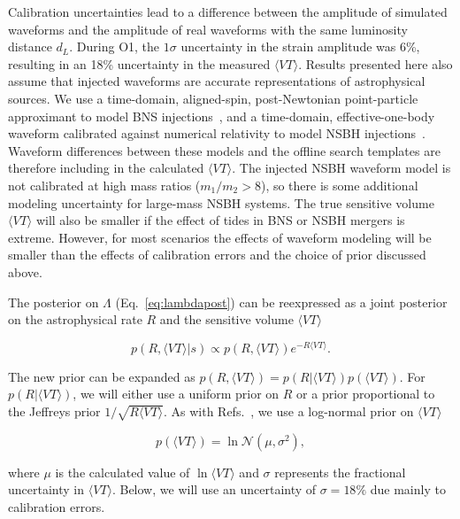 Calibration uncertainties lead to a difference between the amplitude of simulated
waveforms and the amplitude of real waveforms with the same luminosity distance $d_L$.
During \ac{O1}, the $1\sigma$ uncertainty in the strain amplitude was 6\%, resulting
in an 18\% uncertainty in the measured $\langle VT \rangle$. Results presented here
also assume that injected waveforms are accurate
representations of astrophysical sources. We use a time-domain, aligned-spin,
post-Newtonian point-particle approximant to model \ac{BNS}
injections~\citep{Buonanno:2009zt}, and a time-domain, effective-one-body waveform
calibrated against numerical relativity to model \ac{NSBH}
injections~\citep{Pan:2013rra,Taracchini:2013rva}. Waveform differences between these models and
the offline search templates are therefore including in the calculated $\langle VT \rangle$. 
The injected NSBH waveform model is not calibrated at high mass ratios
($m_1/m_2 >8$), so there is some additional modeling uncertainty for large-mass NSBH
systems. The true sensitive volume $\langle VT \rangle$  will also be smaller if the effect of
tides in \ac{BNS} or \ac{NSBH} mergers is extreme. However, for most scenarios
the effects of waveform modeling will be smaller than the
effects of calibration errors and the choice of prior discussed above. 

The posterior on $\Lambda$ (Eq.~\ref{eq:lambdapost}) can be reexpressed as a joint
posterior on the astrophysical rate $R$ and the sensitive volume  $\langle VT \rangle$
\begin{linenomath*}
\begin{equation}
p(R, \langle VT \rangle | s) \propto p(R, \langle VT \rangle) e^{-R \langle VT \rangle}.
\end{equation}
\end{linenomath*}
%
The new prior can be expanded as $p(R, \langle VT \rangle) = p(R | \langle VT \rangle) p(\langle VT \rangle)$. 
For $p(R | \langle VT \rangle)$, we will either use a uniform prior on $R$ or a prior proportional to the 
Jeffreys prior $1/\sqrt{R \langle VT \rangle}$. As with Refs.~\citep{Abbott:2016nhf, Abbott:2016drs, TheLIGOScientific:2016pea}, 
we use a log-normal prior on $\langle VT \rangle$
%
\begin{linenomath*}
\begin{equation}
p(\langle VT \rangle) = \ln \mathcal{N}(\mu, \sigma^2),
\end{equation}
\end{linenomath*}
%
where $\mu$ is the calculated value of $\ln\langle VT \rangle$ and $\sigma$ represents the fractional uncertainty
in $\langle VT \rangle$. Below, we will use an uncertainty of
$\sigma=18\%$ due mainly to calibration errors.

